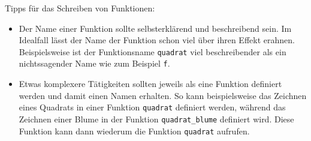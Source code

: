 Tipps für das Schreiben von Funktionen:
\begin{itemize}
	\item Der Name einer Funktion sollte selbsterklärend und beschreibend sein. Im Idealfall lässt der Name der Funktion schon viel über ihren Effekt erahnen. Beispielsweise ist der Funktionsname \lstinline|quadrat| viel beschreibender als ein nichtssagender Name wie zum Beispiel \lstinline|f|.
	\item
	      Etwas komplexere Tätigkeiten sollten jeweils als eine Funktion definiert werden und damit einen Namen erhalten. So kann beispielsweise das Zeichnen eines Quadrats in einer Funktion \lstinline|quadrat| definiert werden, während das Zeichnen einer Blume in der Funktion \lstinline|quadrat_blume| definiert wird. Diese Funktion kann dann wiederum die Funktion \lstinline|quadrat| aufrufen.
\end{itemize}

